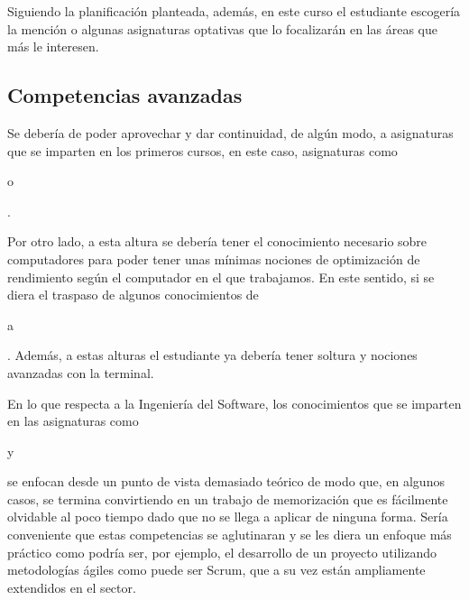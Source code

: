 Siguiendo la planificación planteada, además, en este curso el estudiante escogería la mención 
o algunas asignaturas optativas que lo focalizarán en las áreas que más le interesen.

\subsection{Competencias avanzadas}
Se debería de poder aprovechar y dar continuidad, de algún modo, a asignaturas que se 
imparten en los primeros cursos, en este caso, asignaturas como \subject{Estadística} o 
\subject{Bases de Datos}.

Por otro lado, a esta altura se debería tener el conocimiento necesario sobre computadores 
para poder tener unas mínimas nociones de optimización de rendimiento según el computador 
en el que trabajamos. En este sentido, si se diera el traspaso de algunos conocimientos de 
\subject{Arquitectura y Organización de Computadores} a \subject{Ampliación de Estructura 
de Computadores}. 
Además, a estas alturas el estudiante ya debería tener soltura y nociones 
avanzadas con la terminal.

En lo que respecta a la Ingeniería del Software, los conocimientos que se imparten en las 
asignaturas como \subject{Procesos de Desarrollo Software} y \subject{Gestión de Proyectos 
de Desarrollo de Software} se enfocan desde un punto de vista demasiado teórico de modo que, 
en algunos casos, se termina convirtiendo en un trabajo de memorización que es fácilmente 
olvidable al poco tiempo dado que no se llega a aplicar de ninguna forma. Sería conveniente 
que estas competencias se aglutinaran y se les diera un enfoque más práctico como podría ser, 
por ejemplo, el desarrollo de un proyecto utilizando metodologías ágiles como puede ser Scrum, 
que a su vez están ampliamente extendidos en el sector.


